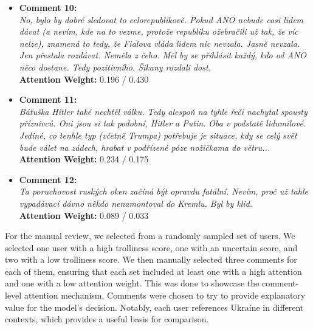 \documentclass[twoside]{ctuthesis}
\theoremstyle{plain}
\theoremstyle{definition}
\theoremstyle{note}
\begin{document}
\begin{tcolorbox}[colback=white, colframe=black, title=User D - Trolliness Score: 0.159 (Multilingual Model) / 0.024 (Russian Model)]
\begin{itemize}
    \item \textbf{Comment 10:} \\
    \textit{No, bylo by dobré sledovat to celorepublikově. Pokud ANO nebude cosi lidem dávat (a nevím, kde na to vezme, protože republiku ožebračili už tak, že víc nelze), znamená to tedy, že Fialova vláda lidem nic nevzala. Jasně nevzala. Jen přestala rozdávat. Neměla z čeho. Měl by se přihlásit každý, kdo od ANO něco dostane. Tedy pozitivního. Šikany rozdali dost.} \\
    \textbf{Attention Weight:} 0.196 / 0.430

    \vspace{0.2cm}

    \item \textbf{Comment 11:} \\
    \textit{Báťuška Hitler také nechtěl válku. Tedy alespoň na tyhle řeči nachytal spousty příznivců. Oni jsou si tak podobní, Hitler a Putin. Oba v podstatě lidumilové. Jediné, co tenhle typ (včetně Trumpa) potřebuje je situace, kdy se celý svět bude válet na zádech, hrabat v podřízené póze nožičkama do větru...} \\
    \textbf{Attention Weight:} 0.234 / 0.175

    \vspace{0.2cm}

    \item \textbf{Comment 12:} \\
    \textit{Ta poruchovost ruských oken začíná být opravdu fatální. Nevím, proč už tahle vypadávací dávno někdo nenamontoval do Kremlu. Byl by klid.} \\
    \textbf{Attention Weight:} 0.089 / 0.033
\end{itemize}
\end{tcolorbox}

For the manual review, we selected from a randomly sampled set of users. We selected one user with a high trolliness score, one with an uncertain score, and two with a low trolliness score. We then manually selected three comments for each of them, ensuring that each set included at least one with a high attention and one with a low attention weight. This was done to showcase the comment-level attention mechanism. Comments were chosen to try to provide explanatory value for the model's decision. Notably, each user references Ukraine in different contexts, which provides a useful basis for comparison.\par
\end{document}
